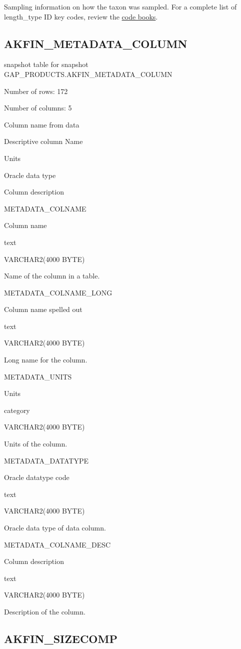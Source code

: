 \documentclass[
  letterpaper,
  oneside,
  open=any]{scrbook}
\begin{document}
Sampling information on how the taxon was sampled. For a complete list
of length\_type ID key codes, review the
\href{https://www.fisheries.noaa.gov/resource/document/groundfish-survey-species-code-manual-and-data-codes-manual}{code
books}.

\subsection{AKFIN\_METADATA\_COLUMN}\label{akfin_metadata_column}

snapshot table for snapshot GAP\_PRODUCTS.AKFIN\_METADATA\_COLUMN

Number of rows: 172

Number of columns: 5

Column name from data

Descriptive column Name

Units

Oracle data type

Column description

METADATA\_COLNAME

Column name

text

VARCHAR2(4000 BYTE)

Name of the column in a table.

METADATA\_COLNAME\_LONG

Column name spelled out

text

VARCHAR2(4000 BYTE)

Long name for the column.

METADATA\_UNITS

Units

category

VARCHAR2(4000 BYTE)

Units of the column.

METADATA\_DATATYPE

Oracle datatype code

text

VARCHAR2(4000 BYTE)

Oracle data type of data column.

METADATA\_COLNAME\_DESC

Column description

text

VARCHAR2(4000 BYTE)

Description of the column.

\subsection{AKFIN\_SIZECOMP}\label{akfin_sizecomp}
\end{document}

